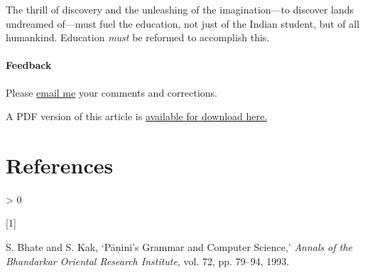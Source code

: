 \documentclass[
  11pt,
  british,
  a4paper,
]{article}
\newlength{\cslhangindent}
\newlength{\csllabelwidth}
\newenvironment{CSLReferences}[2] %
 {%
  \setlength{\parindent}{0pt}
  \ifodd #1 \everypar{\setlength{\hangindent}{\cslhangindent}}\ignorespaces\fi
  \ifnum #2 > 0
  \setlength{\parskip}{#2\baselineskip}
  \fi
 }%
 {}
\newcommand{\CSLLeftMargin}[1]{\parbox[t]{\csllabelwidth}{#1}}
\newcommand{\CSLRightInline}[1]{\parbox[t]{\linewidth - \csllabelwidth}{#1}\break}
\begin{document}
The thrill of discovery and the unleashing of the imagination---to
discover lands undreamed of---must fuel the education, not just of the
Indian student, but of all humankind. Education \emph{must} be reformed
to accomplish this.

\hypertarget{feedback}{%
\paragraph{Feedback}\label{feedback}}

Please \href{mailto:feedback.swanlotus@gmail.com}{email me} your
comments and corrections.

\noindent A PDF version of this article is
\href{./what-ails-indian-education}{available for download here.}

\hypertarget{bibliography}{%
\section*{References}\label{bibliography}}

\hypertarget{refs}{}
\begin{CSLReferences}{0}{0}
\leavevmode\hypertarget{ref-bhatekak1993}{}%
\CSLLeftMargin{{[}1{]} }
\CSLRightInline{S. Bhate and S. Kak, {`{Pāṇini's Grammar and Computer
Science},'} \emph{Annals of the Bhandarkar Oriental Research Institute},
vol. 72, pp. 79--94, 1993. }

\end{CSLReferences}
\end{document}
